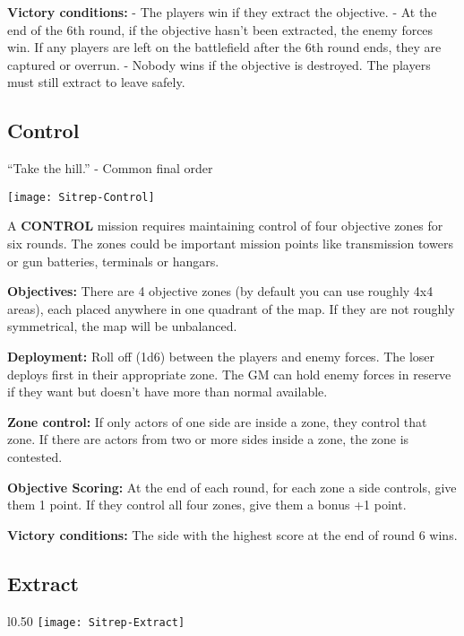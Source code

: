  \textbf{Victory conditions:} 
 - The players win if they extract the objective.
 - At the end of the 6th round, if the objective hasn’t been extracted, the enemy forces win. If any players are left on the battlefield after the 6th round ends, they are captured or overrun.
 - Nobody wins if the objective is destroyed. The players must still extract to leave safely.
          
 \subsection{Control}

 “Take the hill.” - Common final order

 \begin{center}
   \texttt{[image: Sitrep-Control]}
 \end{center}        

 A \textbf{CONTROL} mission requires maintaining control of four objective zones for six rounds. The zones could be important mission points like transmission towers or gun batteries, terminals or hangars.

 \textbf{Objectives:} There are 4 objective zones (by default you can use roughly 4x4 areas), each placed anywhere in one quadrant of the map. If they are not roughly symmetrical, the map will be unbalanced.

 \textbf{Deployment:} Roll off (1d6) between the players and enemy forces. The loser deploys first in their appropriate zone. The GM can hold enemy forces in reserve if they want but doesn’t have more than normal available.

 \textbf{Zone control:} If only actors of one side are inside a zone, they control that zone. If there are actors from two or more sides inside a zone, the zone is contested.

 \textbf{Objective Scoring:} At the end of each round, for each zone a side controls, give them 1 point. If they control all four zones, give them a bonus +1 point.
 
 \textbf{Victory conditions:} The side with the highest score at the end of round 6 wins.
 

 \subsection{Extract}

 \begin{wrapfigure}{l}{0.50\textwidth}
   \centering
   \texttt{[image: Sitrep-Extract]}
 \end{wrapfigure}

